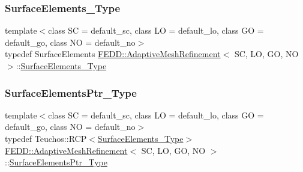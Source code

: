 \mbox{\label{classFEDD_1_1AdaptiveMeshRefinement_afa6eaf74293132701460f9107ce0c070}} 
\subsubsection{\texorpdfstring{Surface\+Elements\+\_\+\+Type}{SurfaceElements\_Type}}
{\footnotesize\ttfamily template$<$class SC = default\+\_\+sc, class LO = default\+\_\+lo, class GO = default\+\_\+go, class NO = default\+\_\+no$>$ \\
typedef Surface\+Elements \hyperlink{classFEDD_1_1AdaptiveMeshRefinement}{F\+E\+D\+D\+::\+Adaptive\+Mesh\+Refinement}$<$ SC, LO, GO, NO $>$\+::\hyperlink{classFEDD_1_1AdaptiveMeshRefinement_afa6eaf74293132701460f9107ce0c070}{Surface\+Elements\+\_\+\+Type}}

\mbox{\label{classFEDD_1_1AdaptiveMeshRefinement_aabda3ef3658f8847265104c6cf9a3877}} 
\subsubsection{\texorpdfstring{Surface\+Elements\+Ptr\+\_\+\+Type}{SurfaceElementsPtr\_Type}}
{\footnotesize\ttfamily template$<$class SC = default\+\_\+sc, class LO = default\+\_\+lo, class GO = default\+\_\+go, class NO = default\+\_\+no$>$ \\
typedef Teuchos\+::\+R\+CP$<$\hyperlink{classFEDD_1_1AdaptiveMeshRefinement_afa6eaf74293132701460f9107ce0c070}{Surface\+Elements\+\_\+\+Type}$>$ \hyperlink{classFEDD_1_1AdaptiveMeshRefinement}{F\+E\+D\+D\+::\+Adaptive\+Mesh\+Refinement}$<$ SC, LO, GO, NO $>$\+::\hyperlink{classFEDD_1_1AdaptiveMeshRefinement_aabda3ef3658f8847265104c6cf9a3877}{Surface\+Elements\+Ptr\+\_\+\+Type}}



